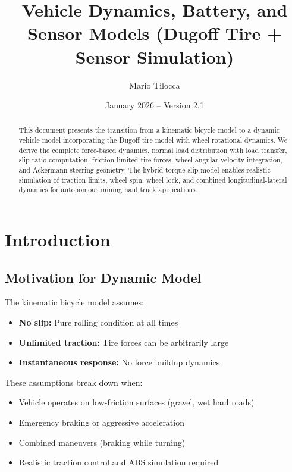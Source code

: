 \documentclass[11pt,a4paper]{article}
\title{Vehicle Dynamics, Battery, and Sensor Models (Dugoff Tire + Sensor Simulation)}
\author{Mario Tilocca}
\date{January 2026 -- Version 2.1}
\begin{document}
\maketitle


\begin{abstract}
This document presents the transition from a kinematic bicycle model to a dynamic vehicle model incorporating the Dugoff tire model with wheel rotational dynamics. We derive the complete force-based dynamics, normal load distribution with load transfer, slip ratio computation, friction-limited tire forces, wheel angular velocity integration, and Ackermann steering geometry. The hybrid torque-slip model enables realistic simulation of traction limits, wheel spin, wheel lock, and combined longitudinal-lateral dynamics for autonomous mining haul truck applications.
\end{abstract}


\tableofcontents
\clearpage


\section{Introduction}

\subsection{Motivation for Dynamic Model}

The kinematic bicycle model assumes:
\begin{itemize}
    \item \textbf{No slip:} Pure rolling condition at all times
    \item \textbf{Unlimited traction:} Tire forces can be arbitrarily large
    \item \textbf{Instantaneous response:} No force buildup dynamics
\end{itemize}

These assumptions break down when:
\begin{itemize}
    \item Vehicle operates on low-friction surfaces (gravel, wet haul roads)
    \item Emergency braking or aggressive acceleration
    \item Combined maneuvers (braking while turning)
    \item Realistic traction control and ABS simulation required
\end{itemize}
\end{document}
